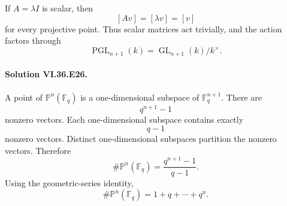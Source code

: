 If \(A=\lambda I\) is scalar, then
\[
[Av]=[\lambda v]=[v]
\]
for every projective point. Thus scalar matrices act trivially, and the action factors through
\[
\operatorname{PGL}_{n+1}(k)
=
\operatorname{GL}_{n+1}(k)/k^\times.
\]

\paragraph{Solution VI.36.E26.}
A point of \(\mathbb P^n(\mathbb F_q)\) is a one-dimensional subspace of \(\mathbb F_q^{n+1}\). There are
\[
q^{n+1}-1
\]
nonzero vectors. Each one-dimensional subspace contains exactly
\[
q-1
\]
nonzero vectors. Distinct one-dimensional subspaces partition the nonzero vectors. Therefore
\[
\#\mathbb P^n(\mathbb F_q)
=
\frac{q^{n+1}-1}{q-1}.
\]
Using the geometric-series identity,
\[
\boxed{
\#\mathbb P^n(\mathbb F_q)
=
1+q+\cdots+q^n.
}
\]

